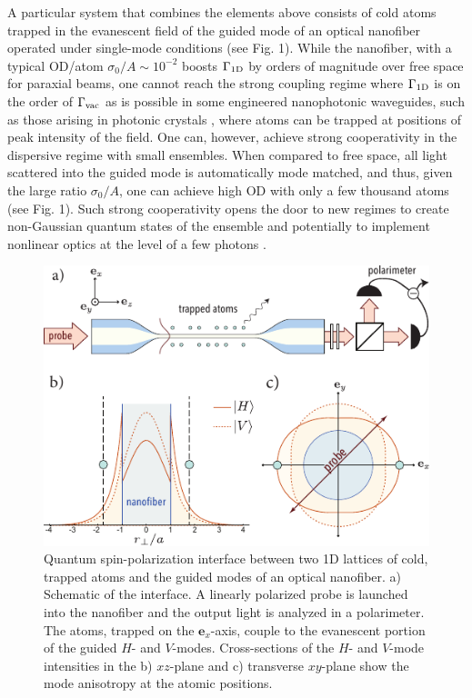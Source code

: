 \documentclass[preprint, aps,pra,onecolumn]{revtex4-1} %
\newcommand{\oneD}{{\rm 1D}}
\newcommand{\vac}{{\rm vac}}
\begin{document}
A particular system that combines the elements above consists of cold atoms trapped in the evanescent field of the guided mode of an optical nanofiber operated under single-mode conditions \cite{vetsch_optical_2010, lacroute_state-insensitive_2012, balykin_quantum_2014} (see Fig. 1).  
While the nanofiber, with a typical OD/atom $\sigma_0/A \sim  10^{-2}$ boosts $\Gamma_{\oneD}$ by orders of magnitude over free space for paraxial beams, one cannot reach the strong coupling regime where $\Gamma_{\oneD}$ is on the order of $\Gamma_{\vac}$ as is possible in some engineered nanophotonic waveguides, such as those arising in photonic crystals \cite{hung_trapped_2013}, where atoms can be trapped at positions of peak intensity of the field.  
One can, however, achieve strong cooperativity in the dispersive regime with small ensembles.  When compared to free space, all light scattered into the guided mode is automatically mode matched, and thus, given the large ratio $\sigma_0/A$, one can achieve high OD with only a few thousand atoms (see Fig. 1).  
Such strong cooperativity opens the door to new regimes to create non-Gaussian quantum states of the ensemble \cite{strobel_fisher_2014} and potentially to implement nonlinear optics at the level of a few photons \cite{shen_coherent_2005, spillane_observation_2008, pittman_ultralow-power_2013, oshea_fiber-optical_2013}.


\begin{figure}[t]
\includegraphics[scale=1]{./Figs/Fig_NanofiberSchematic}
\caption{Quantum spin-polarization interface between two 1D lattices of cold, trapped atoms and the guided modes of an optical nanofiber. a) Schematic of the interface. 
A linearly polarized probe is launched into the nanofiber and the output light is analyzed in a polarimeter. 
The atoms, trapped on the $\mathbf{e}_x$-axis, couple to the evanescent portion of the guided $H$- and $V$-modes. 
Cross-sections of the $H$- and $V$-mode intensities in the b) $xz$-plane and c) transverse $xy$-plane show the mode anisotropy at the atomic positions. }\label{Fig::Schematic}
\end{figure}
\end{document}

